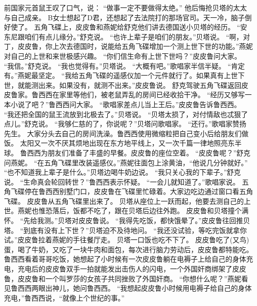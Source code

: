 \documentclass[a4paper,12pt,UTF8,twoside]{ctexbook}
\begin{document}
        前国家元首鼠王叹了口气，说：  
        “做事一定不要做得太绝。”  
        他后悔抢贝塔的太太与自己成亲。  
        B女士想起了D君，还想起了去法院打的那场官司。天一冷，脑子倒好使了。        
        五角飞碟上，皮皮鲁和燕妮给舒克他们讲去德国送小贝塔的经历。  
        “安东尼跟咱们有点儿缘分。”舒克说。  
        “也许上辈子是咱们的朋友。”贝塔说。  
        “啊，对丁，皮皮鲁，你上次去德国时，说能给五角飞碟增加一个测上世下世的功能。”燕妮对自己的上世和来世极感兴趣。  
        “你们信生命有上世下世吗？”皮皮鲁问大家。  
        “我信。”舒克说。  
        “我也觉得有。”贝塔说。  
        “大概有吧。”歌唱家半信半疑。  
        “肯定有。”燕妮最坚定。  
        “我给五角飞碟的遥感仪加一个元件就行了。如果真有上世下世，就能测出来。如果没有，就测不出来。”皮皮鲁说。  
        舒克驾驶五角飞碟返回皮皮鲁家。鲁西西在家里等他们，被老鼠弄乱的房间已经收拾干净。  
        “经历又够写一本小说了吧？”鲁西西问大家。  
        “歌唱家差点儿当上王后。”皮皮鲁告诉鲁西西。  
        “我还把全国的鼠王流放到北极去了。”贝塔说。  
        “贝塔太损了，对付情敌也忒狠了点儿。”舒克说。  
        “我够仁慈的了，你说呢？”贝塔问歌唱家。  
        “还行。”歌唱家赞扬先生。        
        大家分头去自己的房间洗澡。鲁西西使用微缩粒把自己变小后给朋友们做饭。  
        太阳又一次不厌其烦地出现在东方地平线上，又一次千篇一律地照亮东半球。  
        鲁西西为朋友们准备了丰盛的早餐。皮皮鲁的座位空着。  
        “皮皮鲁呢？”舒克问燕妮。  
        “在五角飞碟里改装遥感仪。”燕妮往面包上涂黄油，“他说几分钟就好。”  
        “也不知道我上辈子是什么。”贝塔边喝牛奶边说。  
        “我只关心我的下辈子。”舒克说。  
        “生命真会轮回转世？”鲁西西表示怀疑。  
        “一会儿就知道了。”歌唱家说。  
        五角飞碟停在鲁西西别墅门口，皮皮鲁在飞碟里忙碌着。大家边吃边通过窗口看五角飞碟。  
        皮皮鲁从五角飞碟里出来了。  
        贝塔从座位上一跃而起，他要去测自己的上世。燕妮也惟恐落后，饭都不吃了，跟在贝塔后边往外跑。  
        皮皮鲁和贝塔撞个满怀。  
        “先给我测。”贝塔对皮皮鲁说。  
        “我得先吃饭，都快饿晕了。”皮皮鲁往回推贝塔。        
        “到底有没有上下世？”贝塔迫不及待地问。  
        “我还没试验，等吃完饭就拿你试。”皮皮鲁拉着燕妮的手往餐厅走。  
        贝塔一口饭也吃不下了。  
        皮皮鲁吃了(又鸟)蛋，喝了牛奶，又吃了一块牛肉和面包，每次进行脑力劳动后，皮皮鲁都特能吃。  
        鲁西西看着哥哥吃饭，她想起了小时候有一次皮皮鲁躺在电褥子上给自己的身体充电，充电后的皮皮鲁双手一拍就能发出击伤人的闪电，一个外国奸商绑架了皮皮鲁，皮皮鲁和一个叫罗莎的女孩子共同挫败了外国奸商。  
        “你想什么呢？”燕妮看见鲁西西两眼出神儿，她问鲁西西。  
        “我想起皮皮鲁小时候用电褥子给自己的身体充电，”鲁西西说，“就像上个世纪的事。”  
\end{document}
